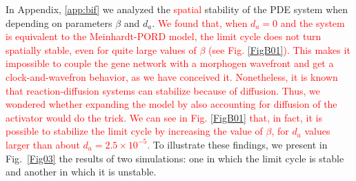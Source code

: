 \documentclass[%
 preprint,
 aip, 
 amsmath,amssymb,
]{revtex4-2}
\begin{document}
In Appendix, \ref{app:bif} we analyzed the \textcolor{red}{spatial} stability of the PDE system when depending on parameters $\beta$ and $d_a$. \textcolor{red}{We found that, when $d_a = 0$ and the system is equivalent to the Meinhardt-PORD model, the limit cycle does not turn spatially stable, even for quite large values of $\beta$ (see Fig. \ref{FigB01}). This makes it impossible to couple the gene network with a morphogen wavefront and get a clock-and-wavefron behavior, as we have conceived it. Nonetheless, it is known that reaction-diffusion systems can stabilize because of diffusion. Thus, we wondered whether expanding the model by also accounting for diffusion of the activator would do the trick. We can see in Fig. \ref{FigB01} that, in fact, it is possible to stabilize the limit cycle by increasing the value of $\beta$, for $d_a$ values larger than about $d_a=2.5\times10^{-5}$.} To illustrate these findings, we present in Fig.~\ref{Fig03} the results of two simulations: one in which the limit cycle is stable and another in which it is unstable. 
\end{document}

